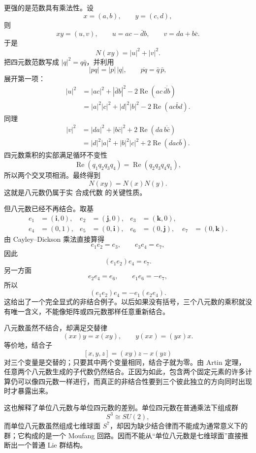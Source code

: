 更强的是范数具有乘法性。设
\[
x=(a,b),\qquad y=(c,d),
\]
则
\[
xy=(u,v),
\qquad
u=ac-\bar d b,
\qquad
v=da+b\bar c.
\]
于是
\[
N(xy)=|u|^2+|v|^2.
\]
把四元数范数写成 $|q|^2=q\bar q$，并利用
\[
|pq|=|p|\,|q|,
\qquad
\overline{pq}=\bar q\,\bar p,
\]
展开第一项：
\[
\begin{aligned}
|u|^2
&=|ac|^2+|\bar d b|^2
-2\operatorname{Re}\!\left(ac\,\overline{\bar d b}\right)\\
&=|a|^2|c|^2+|d|^2|b|^2
-2\operatorname{Re}(ac\bar b d).
\end{aligned}
\]
同理
\[
\begin{aligned}
|v|^2
&=|da|^2+|b\bar c|^2
+2\operatorname{Re}\!\left(da\,\overline{b\bar c}\right)\\
&=|d|^2|a|^2+|b|^2|c|^2
+2\operatorname{Re}(da c\bar b).
\end{aligned}
\]
四元数乘积的实部满足循环不变性
\[
\operatorname{Re}(q_1q_2q_3q_4)
=\operatorname{Re}(q_2q_3q_4q_1),
\]
所以两个交叉项相消。最终得到
\begin{equation*}{
N(xy)=N(x)N(y).
}\end{equation*}
这就是八元数仍属于实 合成代数 的关键性质。

但八元数已经不再结合。取基
\[
\begin{aligned}
e_1&=(\mathbf i,0),&
 e_2&=(\mathbf j,0),&
 e_3&=(\mathbf k,0),\\
e_4&=(0,1),&
 e_5&=(0,\mathbf i),&
 e_6&=(0,\mathbf j),&
 e_7&=(0,\mathbf k).
\end{aligned}
\]
由 Cayley--Dickson 乘法直接算得
\[
e_1e_2=e_3,
\qquad
e_3e_4=e_7,
\]
因此
\[
(e_1e_2)e_4=e_7.
\]
另一方面
\[
e_2e_4=e_6,
\qquad
e_1e_6=-e_7,
\]
所以
\begin{equation*}{
(e_1e_2)e_4=-e_1(e_2e_4).
}\end{equation*}
这给出了一个完全显式的非结合例子。以后如果没有括号，三个八元数的乘积就没有唯一含义，不能像矩阵或四元数那样任意重新结合。

八元数虽然不结合，却满足交替律
\[
(xx)y=x(xy),
\qquad
 y(xx)=(yx)x.
\]
等价地，结合子
\[
[x,y,z]=(xy)z-x(yz)
\]
对三个变量是交替的；只要其中两个变量相同，结合子就为零。由 Artin 定理，任意两个八元数生成的子代数仍然结合。正因为如此，包含两个固定元素的许多计算仍可以像四元数一样进行，而真正的非结合性要到三个彼此独立的方向同时出现时才暴露出来。

这也解释了单位八元数与单位四元数的差别。单位四元数在普通乘法下组成群
\[
S^3\cong SU(2),
\]
而单位八元数虽然组成七维球面 $S^7$，却因为缺少结合律而不能成为通常意义下的群；它构成的是一个 Moufang 回路。因而不能从“单位八元数是七维球面”直接推断出一个普通 Lie 群结构。

